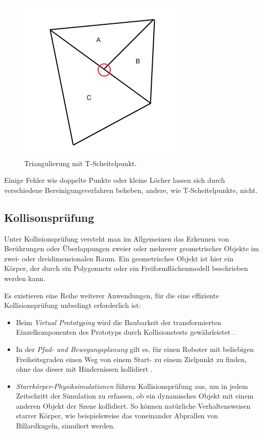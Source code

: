 \begin{figure}[H]
\centerline{
	\includegraphics[width=0.4\columnwidth]{graphics/tvertices.jpg}
}
\caption{Triangulierung mit T-Scheitelpunkt.}
\label{tvertice}
\end{figure}

Einige Fehler wie doppelte Punkte oder kleine L\"ocher lassen sich durch verschiedene Bereinigungsverfahren beheben, andere, wie T-Scheitelpunkte, nicht.

\subsection{Kollisonspr\"ufung}
\label{colGeo}
 
 Unter Kollisionspr\"ufung versteht man im Allgemeinen das Erkennen von Ber\"uhrungen
oder \"Uberlappungen zweier oder mehrerer geometrischer Objekte im zwei- oder dreidimensionalen Raum.
Ein geometrisches Objekt ist hier ein K\"orper, der durch ein Polygonnetz oder
ein Freiformfl\"achenmodell beschrieben werden kann.

Es existieren eine Reihe weiterer Anwendungen, f\"ur die eine effiziente Kollisions\-pr\"ufung
unbedingt erforderlich ist:

\begin{itemize}
	\item Beim {\em Virtual Prototyping} wird die Baubarkeit der transformierten
	Einzelkomponenten des Prototyps durch Kollisionstests gew\"ahrleistet
    \cite{zachmannThesis}.
	\item In der {\em Pfad- und Bewegungsplanung} gilt es, f\"ur einen Roboter mit
	beliebigen Freiheitsgraden einen Weg von einem Start- zu einem Zielpunkt zu
	finden, ohne das dieser mit Hindernissen kollidiert \cite{lavalle}.
	\item {\em Starrk\"orper-Physiksimulationen}  f\"uhren Kollisionspr\"ufung aus,
	um in jedem Zeitschritt der Simulation zu erfassen, ob ein dynamisches Objekt mit einem
	anderen Objekt der Szene kollidiert. So k\"onnen nat\"urliche
	Verhaltensweisen starrer K\"orper, wie beispielsweise das voneinander Abprallen
	von Billardkugeln, simuliert werden.
\end{itemize}

